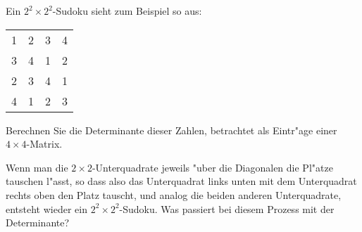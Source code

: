 Ein $2^2\times 2^2$-Sudoku sieht zum Beispiel so aus:
\begin{center}
\begin{tabular}{|cc|cc|}
\hline
1&2&3&4\\
3&4&1&2\\
\hline
2&3&4&1\\
4&1&2&3\\
\hline
\end{tabular}
\end{center}
\begin{teilaufgaben}
\item Berechnen Sie die Determinante dieser Zahlen, betrachtet
als Eintr"age einer $4\times 4$-Matrix.
\item Wenn man die $2\times 2$-Unterquadrate jeweils "uber die Diagonalen
die Pl"atze tauschen l"asst, so dass also das Unterquadrat links unten
mit dem Unterquadrat rechts oben den Platz tauscht, und analog die beiden
anderen Unterquadrate, entsteht wieder ein $2^2\times 2^2$-Sudoku.
Was passiert bei diesem Prozess mit der  Determinante?
\end{teilaufgaben}

